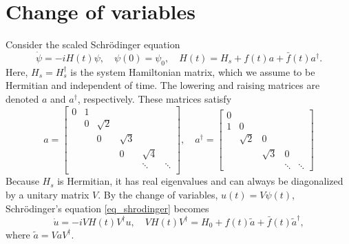 \documentclass[11pt]{article}
\begin{document}



\section{Change of variables}
Consider the scaled Schr\"odinger equation
\begin{equation}\label{eq_shrodinger}
\dot{\psi} = -i H(t) \psi,\quad \psi(0) = \psi_0,\quad H(t) = H_s + f(t)a + \bar{f}(t)a^\dag.
\end{equation}
Here, $H_s = H_s^\dag$ is the system Hamiltonian matrix, which we assume to be Hermitian and
independent of time. The lowering and raising matrices are denoted $a$ and $a^\dag$,
respectively. These matrices satisfy
\begin{equation}\label{eq_matrices}
%
a = \begin{bmatrix}
0 & 1 & & & &\\
 & 0 & \sqrt{2} & & &\\
&  & 0 & \sqrt{3} & &\\
& &  & 0 & \sqrt{4} & \\
& &  &  & \ddots & \ddots\\
\end{bmatrix},\quad
%
a^\dag = \begin{bmatrix}
0 &  & & &\\
1 & 0 & & &\\
&  \sqrt{2} & 0 &  &\\
& &  \sqrt{3} & 0 & \\
& &  & \ddots & \ddots
\end{bmatrix}
\end{equation}
Because $H_s$ is Hermitian, it has real eigenvalues and can always be diagonalized by a unitary
matrix $V$. By the change of variables, $u(t)=V \psi(t)$, Schr\"odinger's equation
\eqref{eq_shrodinger} becomes
\[
\dot{u} = -i VH(t)V^\dag u,\quad VH(t)V^\dag = H_0 + f(t)\tilde{a} + \bar{f}(t)\tilde{a}^\dag,
\]
where $\tilde{a}=V a V^\dag$.
\end{document}
